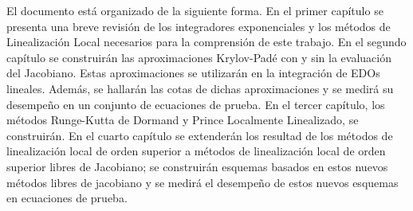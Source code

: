 El documento está organizado de la siguiente forma. En el primer capítulo se presenta una breve revisión de los integradores exponenciales y los métodos de Linealización Local necesarios para la comprensión de este trabajo. En el segundo capítulo se construirán las aproximaciones Krylov-Padé con y sin la evaluación del Jacobiano. Estas aproximaciones se utilizarán en la integración de EDOs lineales. Además, se hallarán las cotas de dichas aproximaciones y se medirá su desempeño en un conjunto de ecuaciones de prueba. En el tercer capítulo, los métodos Runge-Kutta de Dormand y Prince Localmente Linealizado, se construirán. En el cuarto capítulo se extenderán los resultad de los métodos de linealización local de orden superior a métodos de linealización local de orden superior libres de Jacobiano; se construirán esquemas basados en estos nuevos métodos libres de jacobiano y se medirá el desempeño de estos nuevos esquemas en ecuaciones de prueba.


